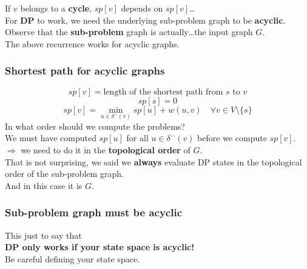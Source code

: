 \documentclass[12pt]{beamer}
\newcommand{\blank}{\vspace{.5cm}}
\begin{document}
\begin{frame}
\end{frame}

\begin{frame}
    If $v$ belongs to a \textbf{cycle}, $sp[v]$ depends on $sp[v]$\ldots \\\blank
    For \textbf{DP} to work, we need the underlying sub-problem graph to be \textbf{acyclic}. \\\blank
    Observe that the \textbf{sub-problem} graph is actually\ldots the input graph $G$. \\\blank
    The above recurrence works for acyclic graphs.

\end{frame}

\begin{frame}
    \frametitle{Shortest path for acyclic graphs}
    \[ sp[v] = \text{length of the shortest path from $s$ to $v$} \]
    \[ sp[s] = 0 \]
    \[ sp[v] = \min_{u \in \delta^-(v)} sp[u] + w(u, v) \quad \forall v \in V \setminus \{s\} \]
    \blank
    In what order should we compute the problems? \pause\\\blank
    We must have computed $sp[u]$ for all $u \in \delta^-(v)$ before we compute $sp[v]$. \\\blank
    $\Rightarrow$ we need to do it in the \textbf{topological order} of $G$. \pause \\\blank
    That is not surprising, we said we \textbf{always} evaluate DP states in the topological order of the sub-problem graph. \\
    And in this case it is $G$.
\end{frame}

\begin{frame}
    \frametitle{Sub-problem graph must be acyclic}
    This just to say that \\\blank
    \textbf{DP only works if your state space is acyclic!} \\\blank
    Be careful defining your state space.
\end{frame}
\end{document}
